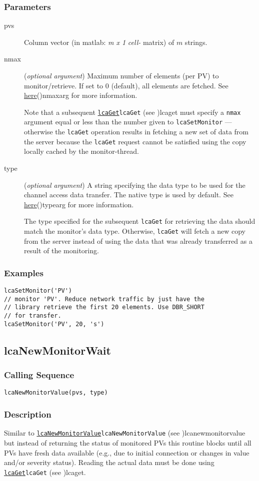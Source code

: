 \documentclass{article}
\newcommand{\com}[1]{{\tt #1}}
\newcommand{\pbrk}{\pagebreak[3]}
\newcommand{\comref}[2]{\hyperref[ref]{\com{#1}}{\com{#1} (see }{)}{#2}}
\newcommand{\ita}[1]{\emph{#1}}
\newcommand{\m}{$m$}
\newcommand{\mhack}{$m$} %
\newcommand{\mxl}{$m\times 1$}
\renewcommand{\m}{\ita{m}}
\newcommand{\mhack}{\ita{m}} %
\renewcommand{\mxl}{\ita{m x 1}}
\renewcommand{\pbrk}{}
\newcommand{\PVITEM}{
\item[pvs] Column vector (in matlab: \mxl{} \ita{cell-} matrix)
of \mhack{} strings.
}
\begin{document}
\subsubsection{Parameters}
\begin{description}
\PVITEM
\item[nmax]
(\ita{optional argument}) Maximum number of elements
(per PV) to monitor/retrieve. If set to 0 (default), all elements are fetched.
See \hyperref[ref]{here}{(}{)}{nmaxarg} for more information.

Note that a subsequent \comref{lcaGet}{lcaget} must specify a \com{nmax}
argument equal or less than the number given to \com{lcaSetMonitor} ---
otherwise the \com{lcaGet} operation results in fetching a new
set of data from the server because the \com{lcaGet} request cannot
be satisfied using the copy locally cached by the monitor-thread.
\item[type]
(\ita{optional argument}) A string specifying the
data type to be used for the channel access data transfer. The
native type is used by default.
See \hyperref[ref]{here}{(}{)}{typearg} for more information.

The type specified for the subsequent \com{lcaGet} for retrieving
the data should match the monitor's data type. Otherwise, \com{lcaGet}
will fetch a new copy from the server instead of using the data that
was already transferred as a result of the monitoring.
\end{description}
\subsubsection{Examples}
\begin{verbatim}
lcaSetMonitor('PV')
// monitor 'PV'. Reduce network traffic by just have the
// library retrieve the first 20 elements. Use DBR_SHORT
// for transfer.
lcaSetMonitor('PV', 20, 's')
\end{verbatim}

\pbrk
\subsection{lcaNewMonitorWait}
\label{lcanewmonitorwait}
\subsubsection{Calling Sequence}
\begin{verbatim}
lcaNewMonitorValue(pvs, type)
\end{verbatim}
\subsubsection{Description}
Similar to \comref{lcaNewMonitorValue}{lcanewmonitorvalue} but instead of
returning the status of monitored PVs this routine blocks until all PVs
have fresh data available (e.g., due to initial connection or changes in
value and/or severity status).
Reading the actual data must be done using \comref{lcaGet}{lcaget}.
\end{document}

